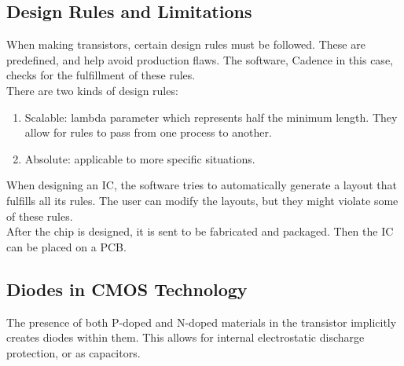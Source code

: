 \documentclass[nobib,fleqn,8pt]{article}
\begin{document}
\subsection{Design Rules and Limitations}
When making transistors, certain design rules must be followed. These are predefined, and help avoid production flaws. The software, Cadence in this case, checks for the fulfillment of these rules.\\
There are two kinds of design rules:
\begin{enumerate}
    \item Scalable: lambda parameter which represents half the minimum length. They allow for rules to pass from one process to another.
    \item Absolute: applicable to more specific situations.
\end{enumerate}
When designing an IC, the software tries to automatically generate a layout that fulfills all its rules. The user can modify the layouts, but they might violate some of these rules.\\
After the chip is designed, it is sent to be fabricated and packaged. Then the IC can be placed on a PCB.\\
\subsection{Diodes in CMOS Technology}
The presence of both P-doped and N-doped materials in the transistor implicitly creates diodes within them. This allows for internal electrostatic discharge protection, or as capacitors.
 
\end{document}
